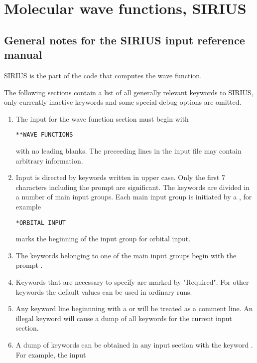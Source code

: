 \chapter{\label{chap:inpref} Molecular wave functions, SIRIUS }
 
\section{\label{sec:ref-notes} General notes for the SIRIUS input reference
manual}

SIRIUS is the part of the code that computes the wave function.
 
The following sections contain a list of all generally relevant keywords to
SIRIUS, only currently inactive keywords and some special debug
options are omitted.

\begin{enumerate}
\item {The input for the wave function section must begin with 
 
\begin{inputex} \begin{verbatim}
**WAVE FUNCTIONS
\end{verbatim} \end{inputex}
   with no leading blanks.  The preceeding lines in the input file may
   contain arbitrary information.
}
\item{ Input is directed by keywords written in upper case.
   Only the first 7 characters including the prompt are significant.
   The keywords are divided in a number of main input groups. Each main
   input group is initiated by a {\starkey}, for example
 
\begin{inputex} \begin{verbatim}
*ORBITAL INPUT
\end{verbatim} \end{inputex}
   marks the beginning of the input group for orbital input.
}
\item { The keywords belonging to one of the main input groups begin with
   the prompt {\dotkey}.
}
\item { Keywords that are necessary to specify are marked by "Required".
   For other keywords the default values can be used in ordinary runs.
}
\item {Any keyword line beginnning with a \quotekw{!} or
   \quotekw{\#} will be treated as a
   comment line.  An illegal keyword will cause a dump of all keywords
   for the current input section.
}
\item{A dump of keywords can be obtained in any input section with the
keyword .  For example, the input
 
}
\end{enumerate}
